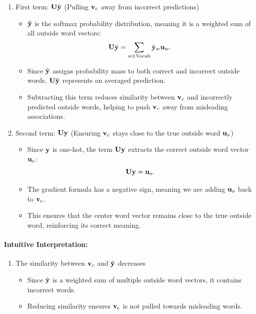 \begin{parts}
{\begin{enumerate}[label=\roman*.]
{        \begin{enumerate}
            \item First term: $\mathbf{U} \hat{\mathbf{y}}$ (Pulling $\mathbf{v}_c$ away from incorrect predictions)
            \begin{itemize}
                \item $\hat{\mathbf{y}}$ is the softmax probability distribution, meaning it is a weighted sum of all outside word vectors:
                \[
                \mathbf{U} \hat{\mathbf{y}} = \sum_{w \in \text{Vocab}} \hat{\mathbf{y}}_w \mathbf{u}_w.
                \]
                \item Since $\hat{\mathbf{y}}$ assigns probability mass to both correct and incorrect outside words, $\mathbf{U} \hat{\mathbf{y}}$ represents an averaged prediction.
                \item Subtracting this term reduces similarity between $\mathbf{v}_c$ and incorrectly predicted outside words, helping to push $\mathbf{v}_c$ away from misleading associations.
            \end{itemize}

            \item Second term: $\mathbf{U} \mathbf{y}$ (Ensuring $\mathbf{v}_c$ stays close to the true outside word $\mathbf{u}_o$)
            \begin{itemize}
                \item Since $\mathbf{y}$ is one-hot, the term $\mathbf{U} \mathbf{y}$ extracts the correct outside word vector $\mathbf{u}_o$:
                \[
                \mathbf{U} \mathbf{y} = \mathbf{u}_o.
                \]
                \item The gradient formula has a negative sign, meaning we are adding $\mathbf{u}_o$ back to $\mathbf{v}_c$.
                \item This ensures that the center word vector remains close to the true outside word, reinforcing its correct meaning.
            \end{itemize}
        \end{enumerate}

        \paragraph{Intuitive Interpretation:}
        \begin{enumerate}
            \item The similarity between $\mathbf{v}_c$ and $\hat{\mathbf{y}}$ decreases
            \begin{itemize}
                \item Since $\hat{\mathbf{y}}$ is a weighted sum of multiple outside word vectors, it contains incorrect words.
                \item Reducing similarity ensures $\mathbf{v}_c$ is not pulled towards misleading words.
            \end{itemize}


\end{enumerate}}
\end{enumerate}}
\end{parts}
